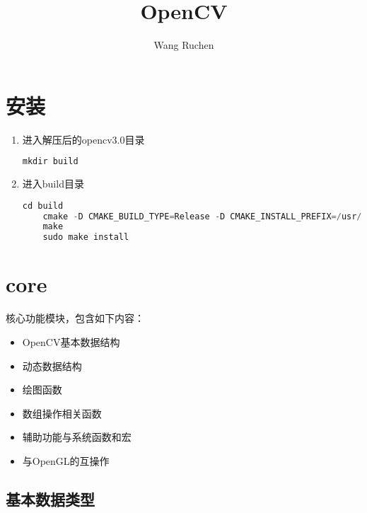 \documentclass[12pt]{article}
\begin{document}
\title{\vspace{-2em}OpenCV\vspace{-0.7em}}
\author{Wang Ruchen}
\maketitle
\thispagestyle{fancy}
\maketitle
\tableofcontents 

\section{安装}
\begin{enumerate}
\item 进入解压后的opencv3.0目录
    \begin{lstlisting}[language=C++]
    mkdir build
    \end{lstlisting}
\item 进入build目录
    \begin{lstlisting}[language=C++]
    cd build
    cmake -D CMAKE_BUILD_TYPE=Release -D CMAKE_INSTALL_PREFIX=/usr/local ..
    make
    sudo make install
    \end{lstlisting}
\end{enumerate}

\section{core}
    核心功能模块，包含如下内容：
\begin{itemize}
\item OpenCV基本数据结构
\item 动态数据结构
\item 绘图函数
\item 数组操作相关函数
\item 辅助功能与系统函数和宏
\item 与OpenGL的互操作
\end{itemize}
\subsection{基本数据类型}
\end{document}
